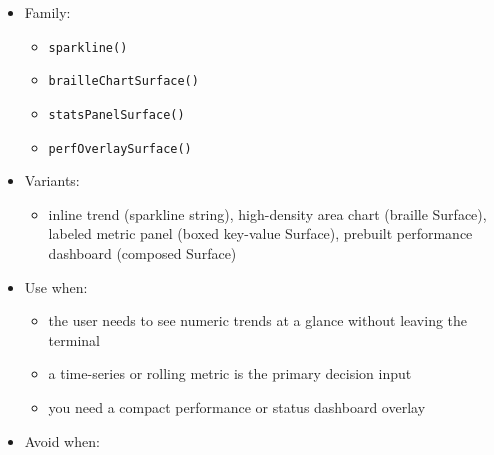 \begin{itemize}
\tightlist
\item
  Family:

  \begin{itemize}
  \tightlist
  \item
    \texttt{s\allowbreak{}p\allowbreak{}a\allowbreak{}r\allowbreak{}k\allowbreak{}l\allowbreak{}i\allowbreak{}n\allowbreak{}e\allowbreak{}(\allowbreak{})}
  \item
    \texttt{b\allowbreak{}r\allowbreak{}a\allowbreak{}i\allowbreak{}l\allowbreak{}l\allowbreak{}e\allowbreak{}C\allowbreak{}h\allowbreak{}a\allowbreak{}r\allowbreak{}t\allowbreak{}S\allowbreak{}u\allowbreak{}r\allowbreak{}f\allowbreak{}a\allowbreak{}c\allowbreak{}e\allowbreak{}(\allowbreak{})}
  \item
    \texttt{s\allowbreak{}t\allowbreak{}a\allowbreak{}t\allowbreak{}s\allowbreak{}P\allowbreak{}a\allowbreak{}n\allowbreak{}e\allowbreak{}l\allowbreak{}S\allowbreak{}u\allowbreak{}r\allowbreak{}f\allowbreak{}a\allowbreak{}c\allowbreak{}e\allowbreak{}(\allowbreak{})}
  \item
    \texttt{p\allowbreak{}e\allowbreak{}r\allowbreak{}f\allowbreak{}O\allowbreak{}v\allowbreak{}e\allowbreak{}r\allowbreak{}l\allowbreak{}a\allowbreak{}y\allowbreak{}S\allowbreak{}u\allowbreak{}r\allowbreak{}f\allowbreak{}a\allowbreak{}c\allowbreak{}e\allowbreak{}(\allowbreak{})}
  \end{itemize}
\item
  Variants:

  \begin{itemize}
  \tightlist
  \item
    inline trend (sparkline string), high-density area chart (braille Surface), labeled metric panel (boxed key-value Surface), prebuilt performance dashboard (composed Surface)
  \end{itemize}
\item
  Use when:

  \begin{itemize}
  \tightlist
  \item
    the user needs to see numeric trends at a glance without leaving the terminal
  \item
    a time-series or rolling metric is the primary decision input
  \item
    you need a compact performance or status dashboard overlay
  \end{itemize}
\item
  Avoid when:


\end{itemize}
